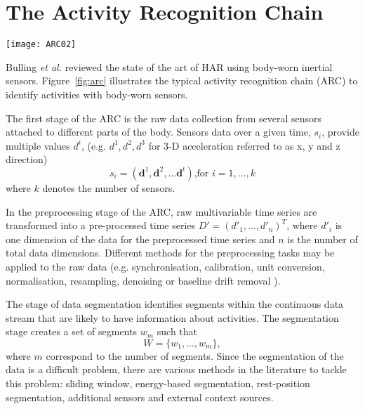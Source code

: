 \documentclass[10pt,journal,compsoc]{IEEEtran}
\begin{document}
\section{The Activity Recognition Chain}

\begin{figure*}
\centering    
 \texttt{[image: ARC02]}
\caption[PA]{Typical activity recognition chain (ARC) to identify activities or gestures
from body-worn inertial sensors. 
Diagram is replicated from the work of Bulling \emph{et al.} \cite{bulling2014}.}
\label{fig:arc}
\end{figure*}

Bulling \emph{et al.} \cite{bulling2014} reviewed the state of the art of
HAR using body-worn inertial sensors.
Figure~\ref{fig:arc} illustrates the typical activity recognition chain (ARC) to identify
activities with body-worn sensors. 

The first stage of the ARC is the raw data collection from several sensors attached to 
different parts of the body. Sensors data over a given time, $s_i$, provide multiple values  $d^i$, 
(e.g. $d^1, d^2, d^3$ for 3-D acceleration referred to as x, y and z direction)
\begin{equation}
s_i = (\textbf{d}^1, \textbf{d}^2,\dots \textbf{d}^t) \mbox{,for } i=1, \dots,k
\end{equation} 
where $k$ denotes the number of sensors. 

In the preprocessing stage of the ARC, raw multivariable time series are transformed into a 
pre-processed time series $D'= (d'_1, \dots, d'_n )^T$, where $d'_i$ is one dimension 
of the data for the preprocessed time series and $n$ is the number of total data dimensions.
Different methods for the preprocessing tasks may be applied to the raw data
(e.g. synchronisation, calibration, unit conversion, normalisation, resampling, denoising 
or baseline drift removal \cite{bulling2014}).

The stage of data segmentation identifies segments within the continuous data stream
that are likely to have information about activities. The segmentation stage creates 
a set of segments $w_m$ %
such that 
\begin{equation}
W = \{   w_1, \dots, w_m  \},
\end{equation} 
where $m$ correspond to the number of segments.
Since the segmentation of the data is a difficult problem, there are various methods 
in the literature to tackle this problem: sliding window, energy-based segmentation, 
rest-position segmentation, additional sensors and external context sources.
\end{document}
